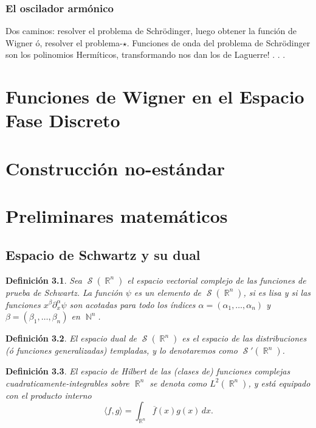 \documentclass[a4paper]{report}
\DeclareMathOperator{\R}{\mathbb{R}}
\DeclareMathOperator{\N}{\mathbb{N}}
\DeclareMathOperator{\Sz}{\mathcal S}
\newtheorem{definition}{Definición}
\begin{document}
  \subsection{El oscilador armónico}

  Dos caminos: resolver el problema de Schrödinger, luego
  obtener la función de Wigner ó, resolver el
  problema-$\star$. Funciones de onda del problema de
  Schrödinger son los polinomios Hermíticos, transformando
  nos dan los de Laguerre! . . .

  \chapter{Funciones de Wigner en el Espacio Fase Discreto}

  \chapter{Construcción no-estándar}

  \newpage
  \appendix

  \chapter{Preliminares matemáticos}

  \section{Espacio de Schwartz y su dual}

  \begin{definition}
    Sea $\Sz(\R^{n})$ el espacio vectorial complejo
    de las funciones de prueba de Schwartz. La función
    $\psi$ es un elemento de $\Sz(\R^{n})$, si es
    lisa y si las funciones $x^{\beta} \partial_x^{\alpha}
    \psi$ son acotadas para todo los índices $\alpha =
    (\alpha_1, \ldots, \alpha_n)$ y $\beta = (\beta_1,
    \ldots, \beta_n)$ en $\N^{n}$.
  \end{definition}

  \begin{definition}
    El espacio dual de $\Sz(\R^{n})$ es el espacio de
    las distribuciones (ó funciones generalizadas)
    templadas, y lo denotaremos como $\Sz'(\R^{n})$.
  \end{definition}

  \begin{definition}
    El espacio de Hilbert de las (clases de) funciones
    complejas cuadraticamente-integrables sobre $\R^{n}$ se
    denota como $L^2(\R^{n})$, y está equipado con el
    producto interno
    \[
      \langle f, g \rangle
      = \int_{\R^{n}} \overline{f}(x) g(x) \, dx.
    \] 
  \end{definition}
 
\end{document}
